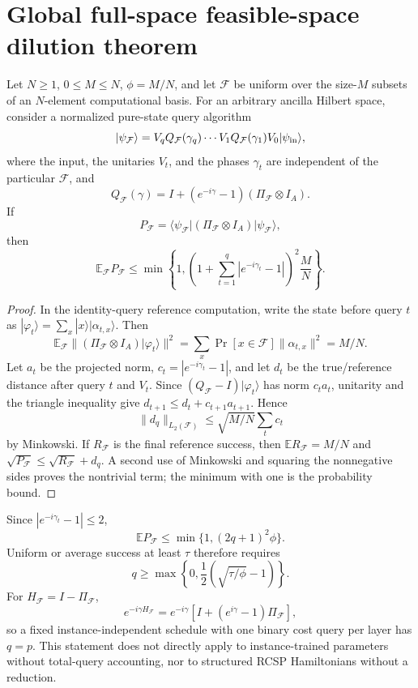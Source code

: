 \section{Global full-space feasible-space dilution theorem}
\label{sec:global-dilution-theorem}

\begin{theorem}
Let $N\ge 1$, $0\le M\le N$, $\phi=M/N$, and let $\mathcal F$ be uniform
over the size-$M$ subsets of an $N$-element computational basis.  For an
arbitrary ancilla Hilbert space, consider a normalized pure-state query
algorithm
\[
 |\psi_{\mathcal F}\rangle=
 V_qQ_{\mathcal F}(\gamma_q)\cdots V_1Q_{\mathcal F}(\gamma_1)
 V_0|\psi_{\rm in}\rangle,
\]
where the input, the unitaries $V_t$, and the phases $\gamma_t$ are independent
of the particular $\mathcal F$, and
\[
 Q_{\mathcal F}(\gamma)=I+(e^{-i\gamma}-1)
 (\Pi_{\mathcal F}\otimes I_A).
\]
If
\[
 P_{\mathcal F}=\langle\psi_{\mathcal F}|(\Pi_{\mathcal F}\otimes I_A)
 |\psi_{\mathcal F}\rangle,
\]
then
\[
 \mathbb E_{\mathcal F}P_{\mathcal F}
 \le \min\left\{1,
 \left(1+\sum_{t=1}^q|e^{-i\gamma_t}-1|\right)^2\frac MN
 \right\}.
\]
\end{theorem}

\begin{proof}
In the identity-query reference computation, write the state before query $t$
as $|\varphi_t\rangle=\sum_x|x\rangle|\alpha_{t,x}\rangle$.  Then
\[
 \mathbb E_{\mathcal F}\|(\Pi_{\mathcal F}\otimes I_A)
 |\varphi_t\rangle\|^2
 =\sum_x\Pr[x\in\mathcal F]\|\alpha_{t,x}\|^2=M/N.
\]
Let $a_t$ be the projected norm, $c_t=|e^{-i\gamma_t}-1|$, and let $d_t$
be the true/reference distance after query $t$ and $V_t$.  Since
$(Q_{\mathcal F}-I)|\varphi_t\rangle$ has norm $c_ta_t$, unitarity and the
triangle inequality give $d_{t+1}\le d_t+c_{t+1}a_{t+1}$.  Hence
\[
 \|d_q\|_{L_2(\mathcal F)}\le\sqrt{M/N}\sum_t c_t
\]
by Minkowski.  If $R_{\mathcal F}$ is the final reference success, then
$\mathbb ER_{\mathcal F}=M/N$ and
$\sqrt{P_{\mathcal F}}\le\sqrt{R_{\mathcal F}}+d_q$.  A second use of
Minkowski and squaring the nonnegative sides proves the nontrivial term; the
minimum with one is the probability bound.
\end{proof}

Since $|e^{-i\gamma_t}-1|\le2$,
\[
 \mathbb E P_{\mathcal F}\le\min\{1,(2q+1)^2\phi\}.
\]
Uniform or average success at least $\tau$ therefore requires
\[
 q\ge\max\left\{0,\frac12(\sqrt{\tau/\phi}-1)\right\}.
\]
For $H_{\mathcal F}=I-\Pi_{\mathcal F}$,
\[
 e^{-i\gamma H_{\mathcal F}}=e^{-i\gamma}
 [I+(e^{i\gamma}-1)\Pi_{\mathcal F}],
\]
so a fixed instance-independent schedule with one binary cost query per layer
has $q=p$.  This statement does not directly apply to instance-trained
parameters without total-query accounting, nor to structured RCSP Hamiltonians
without a reduction.

